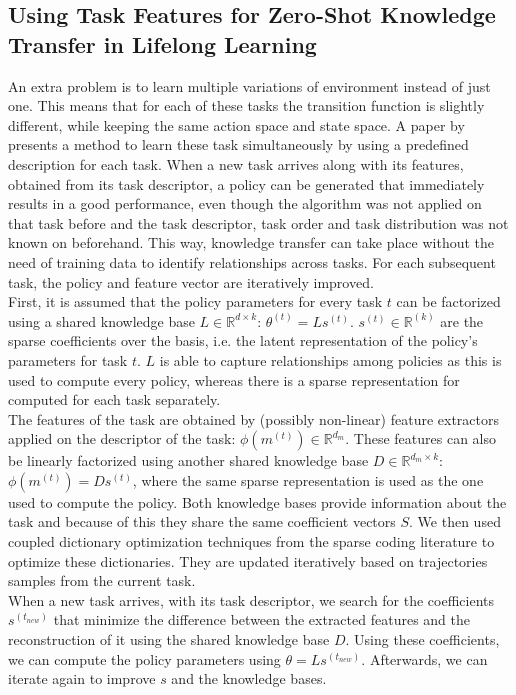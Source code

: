 \documentclass[a4paper]{article}
\begin{document}
\subsection{Using Task Features for Zero-Shot Knowledge Transfer in Lifelong Learning}
An extra problem is to learn multiple variations of environment instead of just one. This means that for each of these tasks the transition function is slightly different, while keeping the same action space and state space.
A paper by \cite{Isele2016UsingLearning} presents a method to learn these task simultaneously by using a predefined description for each task. When a new task arrives along with its features, obtained from its task descriptor, a policy can be generated that immediately results in a good performance, even though the algorithm was not applied on that task before and the task descriptor, task order and task distribution was not known on beforehand. This way, knowledge transfer can take place without the need of training data to identify relationships across tasks. For each subsequent task, the policy and feature vector are iteratively improved.\\
First, it is assumed that the policy parameters for every task $t$ can be factorized using a shared knowledge base $L \in \mathbb{R}^{d \times k}$: $\theta^{(t)} = Ls^{(t)}$. $s^{(t)} \in \mathbb{R}^{(k)}$ are the sparse coefficients over the basis, i.e. the latent representation of the policy's parameters for task $t$. $L$ is able to capture relationships among policies as this is used to compute every policy, whereas there is a sparse representation for computed for each task separately.\\
The features of the task are obtained by (possibly non-linear) feature extractors applied on the descriptor of the task: $\phi(m^{(t)}) \in \mathbb{R}^{d_m}$. These features can also be linearly factorized using another shared knowledge base $D \in \mathbb{R}^{d_m \times k}$: $\phi(m^{(t)}) = Ds^{(t)}$, where the same sparse representation is used as the one used to compute the policy. Both knowledge bases provide information about the task and because of this they share the same coefficient vectors $S$. We then used coupled dictionary optimization techniques from the sparse coding literature to optimize these dictionaries. They are updated iteratively based on trajectories samples from the current task.\\
When a new task arrives, with its task descriptor, we search for the coefficients $s^{(t_{new})}$ that minimize the difference between the extracted features and the reconstruction of it using the shared knowledge base $D$. Using these coefficients, we can compute the policy parameters using $\theta = Ls^{(t_{new})}$. Afterwards, we can iterate again to improve $s$ and the knowledge bases.
\end{document}
